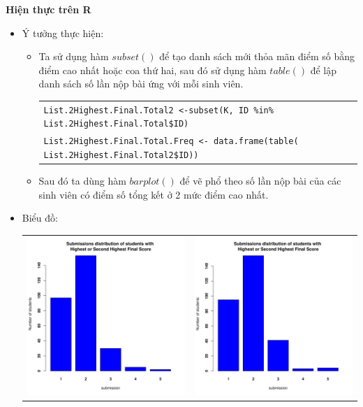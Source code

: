 \documentclass[a4paper]{article}
\theoremstyle{definition}
\begin{document}
\begin{enumerate}[a)]
\begin{itemize}
    \end{itemize}
    \bf Hiện thực trên R\normalfont
    \begin{itemize}
        \item Ý tưởng thực hiện:
        \begin{itemize}
            \item Ta sử dụng hàm $subset()$ để tạo danh sách mới thỏa mãn điểm số bằng điểm cao nhất hoặc coa thứ hai, sau đó sử dụng hàm $table()$ để lập danh sách số lần nộp bài ứng với mỗi sinh viên.
            \begin{center}
                \begin{tabular}{p{13cm}}
                    \texttt{List.2Highest.Final.Total2 <-subset(K, ID \%in\% List.2Highest.Final.Total\$ID)} \\
                    \texttt{List.2Highest.Final.Total.Freq <- data.frame(table( List.2Highest.Final.Total2\$ID))}
                \end{tabular}
            \end{center}
            \item Sau đó ta dùng hàm $barplot()$ để vẽ phổ theo số lần nộp bài của các sinh viên có điểm số tổng kết ở 2 mức điểm cao nhất.
        \end{itemize}
        \item Biểu đồ:\\
        \begin{center}
            \begin{tabular}{c c}
                 \includegraphics[width = 6.9cm]{Images/img2-5-1.png} & \includegraphics[width = 6.9cm]{Images/img2-5-2.png} \\

\end{tabular}
\end{center}
\end{itemize}
\end{enumerate}
\end{document}
